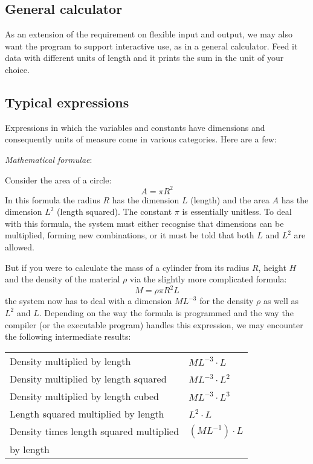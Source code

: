 \documentclass{article}
\begin{document}
\subsection*{General calculator}
As an extension of the requirement on flexible input and output, we may also want the program to support interactive use,
as in a general calculator. Feed it data with different units of length and it prints the sum in the unit of your choice.

\subsection*{Typical expressions}
Expressions in which the variables and constants have dimensions and consequently units of measure come in various
categories. Here are a few:

\vspace{\baselineskip}
\noindent \emph{Mathematical formulae}:

\noindent Consider the area of a circle:
\begin{equation}
    A = \pi R^2
\end{equation}
%
In this formula the radius $R$ has the dimension $L$ (length) and the area $A$ has the dimension $L^2$ (length squared). The
constant $\pi$ is essentially unitless. To deal with this formula, the system must either recognise that dimensions can
be multiplied, forming new combinations, or it must be told that both $L$ and $L^2$ are allowed.

But if you were to calculate the mass of a cylinder from its radius $R$, height $H$ and the density of the material $\rho$
via the slightly more complicated formula:
\begin{equation}
    M = \rho \pi R^2 L
\end{equation}
\noindent the system now has to deal with a dimension $M L^{-3}$ for the density $\rho$ as well as $L^2$ and $L$. Depending on the way the
formula is programmed and the way the compiler (or the executable program) handles this expression, we may encounter the
following intermediate results:

\vspace{\baselineskip}
\begin{tabular}{ll}
\hline
Density multiplied by length                       &   $M L^{-3} \cdot L$   \\
Density multiplied by length squared               &   $M L^{-3} \cdot L^2$ \\
Density multiplied by length cubed                 &   $M L^{-3} \cdot L^3$ \\
Length squared multiplied by length                &   $L^2 \cdot L$        \\
Density times length squared multiplied            &   $(M L^{-1}) \cdot L$ \\
by length                                          &                        \\
\hline
\end{tabular}
\vspace{\baselineskip}
\end{document}
